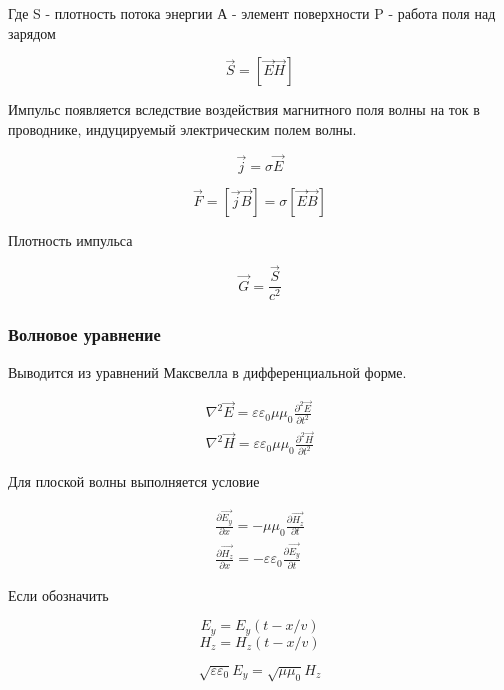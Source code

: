 Где S - плотность потока энергии А - элемент поверхности P - работа поля над зарядом


\begin{equation}
\overrightarrow{S} = [\overrightarrow{E} \overrightarrow{H} ]
\end{equation}


Импульс появляется вследствие воздействия магнитного поля волны на ток в проводнике, индуцируемый электрическим полем волны.

\begin{equation}
\overrightarrow{j} = \sigma \overrightarrow{E}
\end{equation}


\begin{equation}
\overrightarrow{F} = [\overrightarrow{j} \overrightarrow{B}] = \sigma [\overrightarrow{E} \overrightarrow{B}]
\end{equation}

Плотность импульса

\begin{equation}
\overrightarrow{G} = \frac{\overrightarrow{S}}{c^2}
\end{equation}

\subsubsection{Волновое уравнение}

Выводится из уравнений Максвелла в дифференциальной форме.


\begin{eqnarray}
\nabla^2 \overrightarrow{E} = \varepsilon \varepsilon_0 \mu \mu_0  \frac{\partial^2 \overrightarrow{E}}{ \partial t^2} \\
\nabla^2 \overrightarrow{H} = \varepsilon \varepsilon_0 \mu \mu_0 \frac{\partial^2 \overrightarrow{H}}{ \partial t^2}
\end{eqnarray}


Для плоской волны выполняется условие


\begin{eqnarray}
\frac{\partial \overrightarrow{E_y} } {\partial x} = - \mu \mu_0 \frac{\partial \overrightarrow{H_z}} {\partial t} \\
\frac{\partial  \overrightarrow{H_z}} {\partial x} = - \varepsilon \varepsilon_0 \frac{\partial  \overrightarrow{E_y}} {\partial t}
\end{eqnarray}

Если обозначить 

\begin{equation}
E_y = E_y (t - x/v)
\end{equation}
\begin{equation}
H_z = H_z (t - x/v)
\end{equation}

\begin{equation}
\sqrt{\varepsilon \varepsilon_0} E_y = \sqrt{\mu \mu_0 } H_z
\end{equation}
